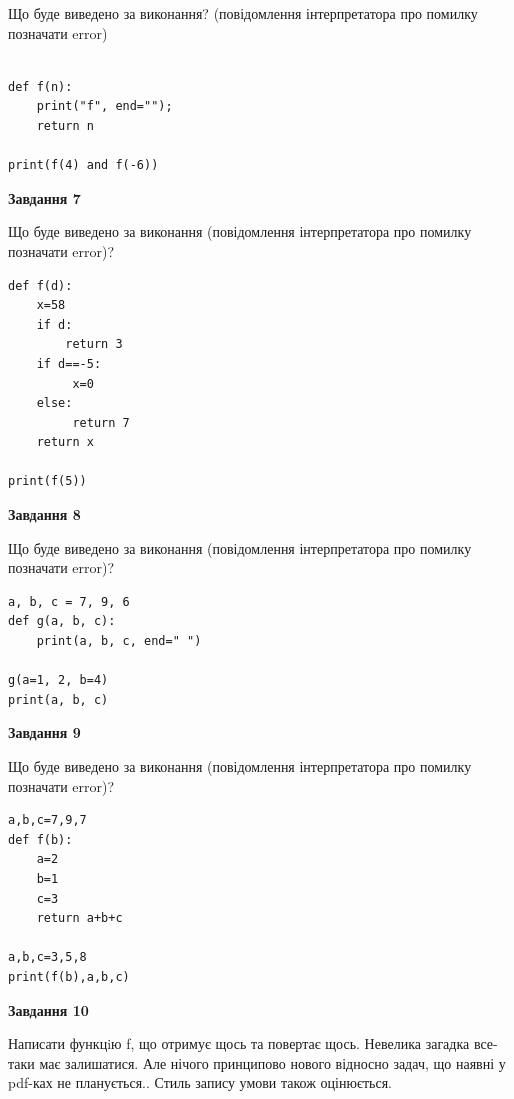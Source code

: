 \documentclass[12pt, ukrainian]{article}
\begin{document}
{\begin {large}
Що буде виведено за виконання? (повідомлення інтерпретатора про помилку позначати error)\par
\begin{verbatim}

def f(n):
    print("f", end="");
    return n

print(f(4) and f(-6))
\end{verbatim}

{\begin {center}\textbf{Завдання 7}\end {center}}

Що буде виведено за виконання (повідомлення інтерпретатора про помилку позначати error)?\par
\begin{verbatim}
def f(d):
    x=58
    if d: 
        return 3
    if d==-5:
         x=0
    else:
         return 7
    return x

print(f(5))
\end{verbatim}

{\begin {center}\textbf{Завдання 8}\end {center}}

Що буде виведено за виконання (повідомлення інтерпретатора про помилку позначати error)?\par
\begin{verbatim}
a, b, c = 7, 9, 6
def g(a, b, c):
    print(a, b, c, end=" ")

g(a=1, 2, b=4)
print(a, b, c)
\end{verbatim}

{\begin {center}\textbf{Завдання 9}\end {center}}

Що буде виведено за виконання (повідомлення інтерпретатора про помилку позначати error)?\par
\begin{verbatim}
a,b,c=7,9,7
def f(b):
    a=2
    b=1
    c=3
    return a+b+c

a,b,c=3,5,8
print(f(b),a,b,c)
\end{verbatim}

{\begin {center}\textbf{Завдання 10}\end {center}}


Написати функцiю f, що отримує щось та повертає щось. Невелика загадка все-таки має залишатися. Але нічого принципово нового відносно задач, що наявні у pdf-ках не планується.. Стиль запису умови також оцінюється.\par
\end {large}}
\newpage
\end{document}
